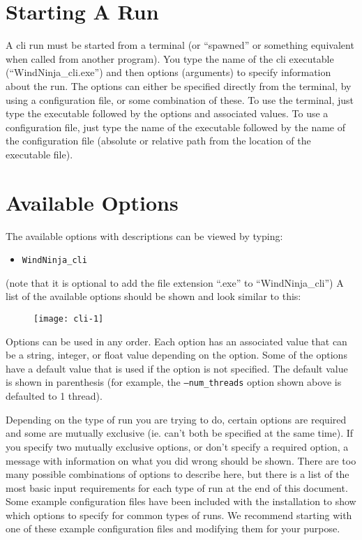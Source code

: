 \documentclass[12pt]{article}
\begin{document}
\section*{Starting A Run}
A cli run must be started from a terminal (or “spawned” or something equivalent when called from another program).  You type the name of the cli executable (“WindNinja\_cli.exe”) and then options (arguments) to specify information about the run.  The options can either be specified directly from the terminal, by using a configuration file, or some combination of these.  To use the terminal, just type the executable followed by the options and associated values.  To use a configuration file, just type the name of the executable followed by the name of the configuration file (absolute or relative path from the location of the executable file).  %

\section*{Available Options}
The available options with descriptions can be viewed by typing:
\begin{itemize}
\item[]\texttt{WindNinja\_cli} 
\end{itemize}
(note that it is optional to add the file extension “.exe” to “WindNinja\_cli”)
A list of the available options should be shown and look similar to this:
\begin{figure}[H]
	\centering
	\label{}
	\texttt{[image: cli-1]}
\end{figure}

Options can be used in any order.  Each option has an associated value that can be a string, integer, or float value depending on the option.  Some of the options have a default value that is used if the option is not specified.  The default value is shown in parenthesis (for example,  the \texttt{--num\_threads} option shown above is defaulted to 1 thread).

Depending on the type of run you are trying to do, certain options are required and some are mutually exclusive (ie. can't both be specified at the same time).  If you specify two mutually exclusive options, or don't specify a required option, a message with information on what you did wrong should be shown.  There are too many possible combinations of options to describe here, but there is a list of the most basic input requirements for each type of run at the end of this document. Some example configuration files have been included with the installation to show which options to specify for common types of runs.  We recommend starting with one of these example configuration files and modifying them for your purpose.
\newpage
\end{document}
